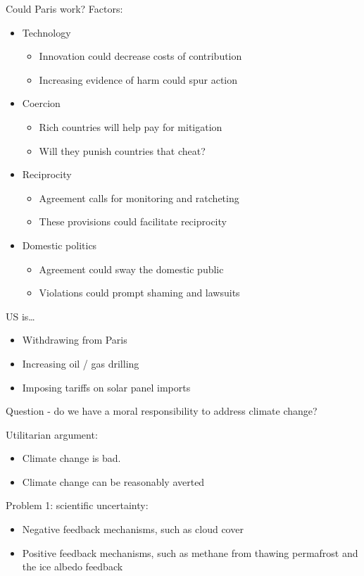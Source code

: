 \documentclass{article}
\begin{document}
  Could Paris work?  Factors:
  \begin{itemize}
    \item Technology
      \begin{itemize}
        \item Innovation could decrease costs of contribution
        \item Increasing evidence of harm could spur action
      \end{itemize}
    \item Coercion
      \begin{itemize}
        \item Rich countries will help pay for mitigation
        \item Will they punish countries that cheat?
      \end{itemize}
    \item Reciprocity
      \begin{itemize}
        \item Agreement calls for monitoring and ratcheting
        \item These provisions could facilitate reciprocity
      \end{itemize}
    \item Domestic politics
      \begin{itemize}
        \item Agreement could sway the domestic public
        \item Violations could prompt shaming and lawsuits
      \end{itemize}
  \end{itemize}

  US is\ldots
  \begin{itemize}
    \item Withdrawing from Paris
    \item Increasing oil / gas drilling
    \item Imposing tariffs on solar panel imports
  \end{itemize}

  Question - do we have a moral responsibility to address climate change?

  Utilitarian argument:
  \begin{itemize}
    \item Climate change is bad.
    \item Climate change can be reasonably averted
  \end{itemize}

  Problem 1: scientific uncertainty:
  \begin{itemize}
    \item Negative feedback mechanisms, such as cloud cover
    \item Positive feedback mechanisms, such as methane from thawing permafrost and the ice albedo feedback
  \end{itemize}
\end{document}
